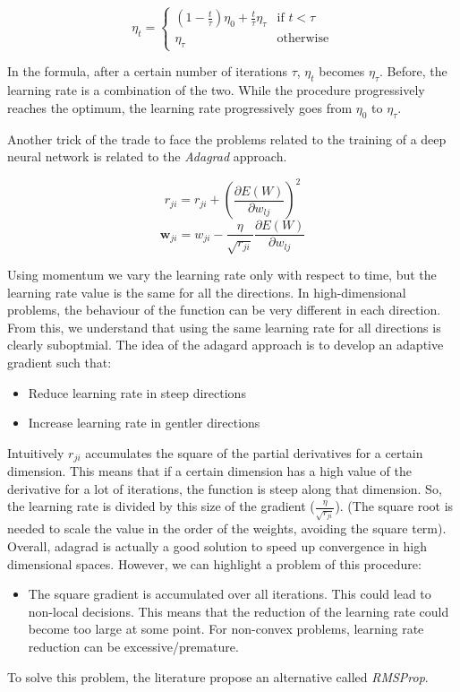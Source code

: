 $$\eta_t =
\begin{cases}
    (1-\frac{t}{\tau})\eta_0 + \frac{t}{\tau} \eta_{\tau} &\text{if $t<\tau$}\\
    \eta_\tau &\text{otherwise}
\end{cases}$$

In the formula, after a certain number of iterations $\tau$, $\eta_t$ becomes $\eta_\tau$. Before, the learning rate is a combination of the two. While the procedure progressively reaches the optimum, the learning rate progressively goes from $\eta_0$ to $\eta_\tau$. \newline

Another trick of the trade to face the problems related to the training of a deep neural network is related to the \textit{Adagrad} approach.

$$r_{ji} = r_{ji} + (\frac{\partial E(W)}{\partial w_{lj}})^2$$
$$\pmb{w}_{ji} = w_{ji} - \frac{\eta}{\sqrt{r_{ji}}} \frac{\partial E(W)}{\partial w_{lj}}$$

Using momentum we vary the learning rate only with respect to time, but the learning rate value is the same for all the directions. In high-dimensional problems, the behaviour of the function can be very different in each direction. From this, we understand that using the same learning rate for all directions is clearly suboptmial. The idea of the adagard approach is to develop an adaptive gradient such that:
\begin{itemize}
    \item Reduce learning rate in steep directions
    \item Increase learning rate in gentler directions
\end{itemize}

Intuitively $r_{ji}$ accumulates the square of the partial derivatives for a certain dimension. This means that if a certain dimension has a high value of the derivative for a lot of iterations, the function is steep along that dimension. So, the learning rate is divided by this size of the gradient ($\frac{\eta}{\sqrt{r_{ji}}}$). (The square root is needed to scale the value in the order of the weights, avoiding the square term).\\
Overall, adagrad is actually a good solution to speed up convergence in high dimensional spaces. However, we can highlight a problem of this procedure:
\begin{itemize}
    \item The square gradient is accumulated over all iterations. This could lead to non-local decisions. This means that the reduction of the learning rate could become too large at some point. For non-convex problems, learning rate reduction can be excessive/premature.
\end{itemize}
To solve this problem, the literature propose an alternative called \textit{RMSProp}.

